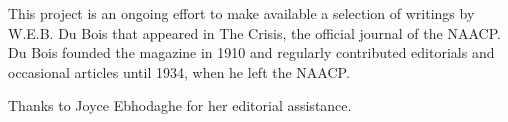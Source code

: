 \documentclass[letterpaper,10pt,english]{jupyterBook}
\title{Dare You Fight&#58;<br/>W.E.B. Du Bois<br/>in The Crisis}
\date{Oct 07, 2022}
\author{William E.\@{} Burghardt Du Bois}
\begin{document}
\pagestyle{empty}
\sphinxmaketitle
\pagestyle{plain}
\sphinxtableofcontents
\pagestyle{normal}
\label{\detokenize{index::doc}}


\sphinxAtStartPar
{}

\sphinxAtStartPar
This project is an ongoing effort to make available a selection of  writings by W.E.B. Du Bois that appeared in The Crisis, the official journal of the NAACP. Du Bois founded the magazine in 1910 and regularly contributed editorials and occasional articles until 1934, when he left the NAACP.

\sphinxAtStartPar
{}

\sphinxAtStartPar
Thanks to Joyce Ebhodaghe for her editorial assistance.
\end{document}
